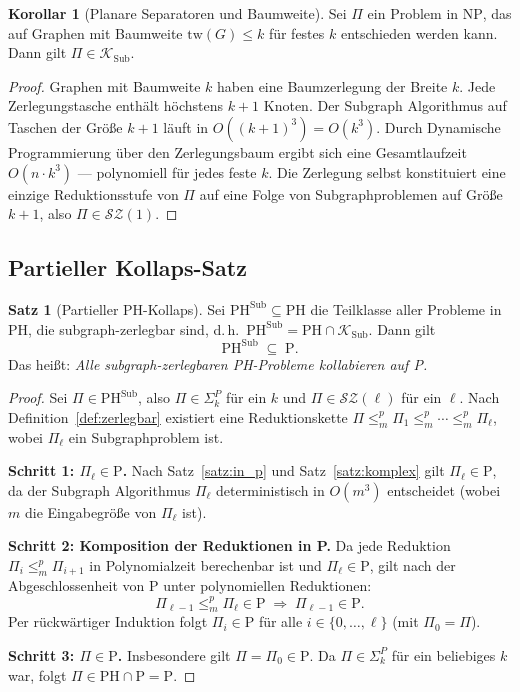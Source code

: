 ﻿\documentclass[a4paper,12pt]{article}
\theoremstyle{definition}
\newtheorem{satz}{Satz}
\newtheorem{korollar}{Korollar}
\begin{document}
\begin{korollar}[Planare Separatoren und Baumweite]
\label{kor:baumweite}
  Sei $\Pi$ ein Problem in $\mathrm{NP}$, das auf Graphen mit Baumweite
  $\mathrm{tw}(G) \leq k$ für festes $k$ entschieden werden kann.
  Dann gilt $\Pi \in \mathcal{K}_\mathrm{Sub}$.
\end{korollar}

\begin{proof}
  Graphen mit Baumweite $k$ haben eine Baumzerlegung der Breite $k$.
  Jede Zerlegungstasche enthält höchstens $k+1$ Knoten.
  Der Subgraph Algorithmus auf Taschen der Größe $k+1$ läuft in $O((k+1)^3) = O(k^3)$.
  Durch Dynamische Programmierung über den Zerlegungsbaum ergibt sich eine
  Gesamtlaufzeit $O(n \cdot k^3)$ --- polynomiell für jedes feste $k$.
  Die Zerlegung selbst konstituiert eine einzige Reduktionsstufe
  von $\Pi$ auf eine Folge von Subgraphproblemen auf Größe $k+1$,
  also $\Pi \in \mathcal{SZ}(1)$.
\end{proof}

\subsection{Partieller Kollaps-Satz}

\begin{satz}[Partieller PH-Kollaps]
\label{satz:kollaps}
  Sei $\mathrm{PH}^{\mathrm{Sub}} \subseteq \mathrm{PH}$ die Teilklasse aller
  Probleme in $\mathrm{PH}$, die subgraph-zerlegbar sind, d.\,h.\
  $\mathrm{PH}^{\mathrm{Sub}} = \mathrm{PH} \cap \mathcal{K}_\mathrm{Sub}$.
  Dann gilt
  \[
    \mathrm{PH}^{\mathrm{Sub}} \;\subseteq\; \mathrm{P}.
  \]
  Das heißt: \emph{Alle subgraph-zerlegbaren PH-Probleme kollabieren auf P.}
\end{satz}

\begin{proof}
  Sei $\Pi \in \mathrm{PH}^{\mathrm{Sub}}$, also $\Pi \in \Sigma_k^P$ für ein $k$
  und $\Pi \in \mathcal{SZ}(\ell)$ für ein $\ell$.
  Nach Definition~\ref{def:zerlegbar} existiert eine Reduktionskette
  $\Pi \leq_m^p \Pi_1 \leq_m^p \cdots \leq_m^p \Pi_\ell$,
  wobei $\Pi_\ell$ ein Subgraphproblem ist.

  \textbf{Schritt 1: $\Pi_\ell \in \mathrm{P}$.}
  Nach Satz~\ref{satz:in_p} und Satz~\ref{satz:komplex} gilt
  $\Pi_\ell \in \mathrm{P}$, da der Subgraph Algorithmus $\Pi_\ell$
  deterministisch in $O(m^3)$ entscheidet (wobei $m$ die Eingabegröße von $\Pi_\ell$ ist).

  \textbf{Schritt 2: Komposition der Reduktionen in P.}
  Da jede Reduktion $\Pi_i \leq_m^p \Pi_{i+1}$ in Polynomialzeit berechenbar ist
  und $\Pi_\ell \in \mathrm{P}$, gilt nach der Abgeschlossenheit von P
  unter polynomiellen Reduktionen:
  \[
    \Pi_{\ell-1} \leq_m^p \Pi_\ell \in \mathrm{P} \;\Rightarrow\; \Pi_{\ell-1} \in \mathrm{P}.
  \]
  Per rückwärtiger Induktion folgt $\Pi_i \in \mathrm{P}$ für alle
  $i \in \{0, \ldots, \ell\}$ (mit $\Pi_0 = \Pi$).

  \textbf{Schritt 3: $\Pi \in \mathrm{P}$.}
  Insbesondere gilt $\Pi = \Pi_0 \in \mathrm{P}$.
  Da $\Pi \in \Sigma_k^P$ für ein beliebiges $k$ war,
  folgt $\Pi \in \mathrm{PH} \cap \mathrm{P} = \mathrm{P}$.
\end{proof}
\end{document}
